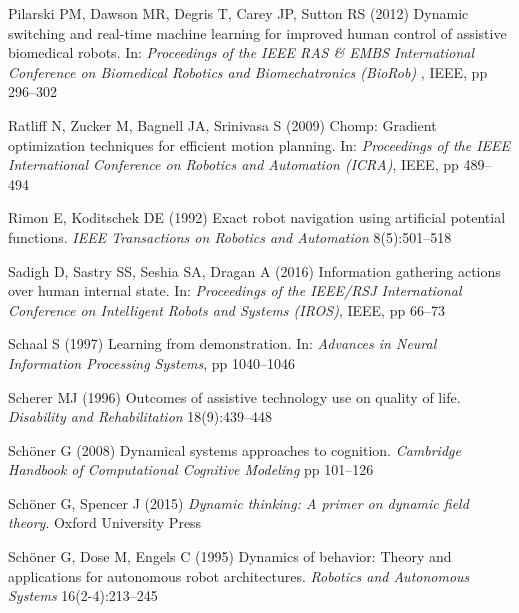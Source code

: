 \documentclass[natbib, twocolumn]{svjour3}          %
\begin{document}
\begin{thebibliography}{54}
	Pilarski PM, Dawson MR, Degris T, Carey JP, Sutton RS (2012) Dynamic switching
	and real-time machine learning for improved human control of assistive
	biomedical robots. In: \textit{Proceedings of the IEEE RAS \& EMBS
		International Conference on Biomedical Robotics and Biomechatronics (BioRob)
	}, IEEE, pp 296--302
	
	Ratliff N, Zucker M, Bagnell JA, Srinivasa S (2009) Chomp: Gradient
	optimization techniques for efficient motion planning. In:
	\textit{Proceedings of the IEEE International Conference on Robotics and
		Automation (ICRA)}, IEEE, pp 489--494
	
	Rimon E, Koditschek DE (1992) Exact robot navigation using artificial potential
	functions. \textit{IEEE Transactions on Robotics and Automation}
	8(5):501--518
	
	Sadigh D, Sastry SS, Seshia SA, Dragan A (2016) Information gathering actions
	over human internal state. In: \textit{Proceedings of the IEEE/RSJ
		International Conference on Intelligent Robots and Systems (IROS)}, IEEE, pp
	66--73
	
	Schaal S (1997) Learning from demonstration. In: \textit{Advances in Neural
		Information Processing Systems}, pp 1040--1046
	
	Scherer MJ (1996) Outcomes of assistive technology use on quality of life.
	\textit{Disability and Rehabilitation} 18(9):439--448
	
	Sch{\"o}ner G (2008) Dynamical systems approaches to cognition.
	\textit{Cambridge Handbook of Computational Cognitive Modeling} pp 101--126
	
	Sch{\"o}ner G, Spencer J (2015) \textit{Dynamic thinking: A primer on dynamic
		field theory}. Oxford University Press
	
	Sch{\"o}ner G, Dose M, Engels C (1995) Dynamics of behavior: Theory and
	applications for autonomous robot architectures. \textit{Robotics and
		Autonomous Systems} 16(2-4):213--245
	

\end{thebibliography}
\end{document}
